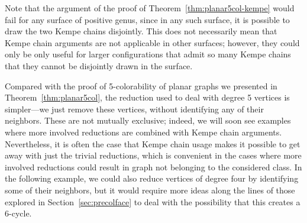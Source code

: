 \documentclass[12pt,twoside,openright,a4paper]{book}
\begin{document}
Note that the argument of the proof of Theorem~\ref{thm:planar5col-kempe} would fail for any surface of positive genus,
since in any such surface, it is possible to draw the two Kempe chains disjointly.  This does not necessarily mean that
Kempe chain arguments are not applicable in other surfaces; however, they could only be only useful for larger configurations
that admit so many Kempe chains that they cannot be disjointly drawn in the surface.

Compared with the proof of 5-colorability of planar graphs we presented in Theorem~\ref{thm:planar5col},
the reduction used to deal with degree 5 vertices is simpler---we just remove these vertices, without
identifying any of their neighbors.  These are not mutually exclusive; indeed, we will soon see examples
where more involved reductions are combined with Kempe chain arguments.  Nevertheless, it is often the case
that Kempe chain usage makes it possible to get away with just the trivial reductions, which is convenient
in the cases where more involved reductions could result in graph not belonging to the considered class.
In the following example, we could also reduce vertices of degree four by identifying some of their neighbors,
but it would require more ideas along the lines of those explored in Section~\ref{sec:precolface} to deal
with the possibility that this creates a $6$-cycle.
\end{document}
